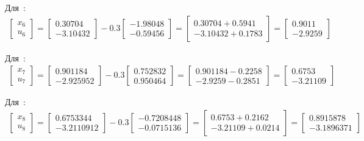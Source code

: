 \begin{enumerate}
	Для \,:
	\begin{align*}
		\begin{bmatrix}
			x_{6} \\ u_{6}
		\end{bmatrix}
		=
		\begin{bmatrix}
		   0.30704 \\
		  -3.10432
		\end{bmatrix}
		-
		0.3
		\begin{bmatrix}
			-1.98048 \\
			-0.59456
		\end{bmatrix}
		=
		\begin{bmatrix}
			0.30704 + 0.5941 \\ -3.10432 + 0.1783
		\end{bmatrix}
		= 
		\begin{bmatrix}
			0.9011 \\ -2.9259
		\end{bmatrix}	
	\end{align*}

	Для \,:
	\begin{align*}
		\begin{bmatrix}
		x_{7} \\ u_{7}
		\end{bmatrix}
		=
		\begin{bmatrix}
		   0.901184 \\
		  -2.925952
		\end{bmatrix}
		-
		0.3
		\begin{bmatrix}
			   0.752832 \\
			0.950464
		\end{bmatrix}
		=
		\begin{bmatrix}
			0.901184 - 0.2258 \\ -2.9259 - 0.2851
		\end{bmatrix}
		= 
		\begin{bmatrix}
			0.6753 \\ -3.21109
		\end{bmatrix}	
	\end{align*}

	Для \,:
	\begin{align*}
		\begin{bmatrix}
			x_{8} \\ u_{8}
		\end{bmatrix}
		=
		\begin{bmatrix}
			0.6753344\\
			-3.2110912
		\end{bmatrix}
		-
		0.3
		\begin{bmatrix}
			-0.7208448 \\
			-0.0715136
		\end{bmatrix}
		=
		\begin{bmatrix}
			0.6753 + 0.2162 \\ -3.21109 + 0.0214
		\end{bmatrix}
		= 
		\begin{bmatrix}
			0.8915878\\
			-3.1896371
		\end{bmatrix}	
	\end{align*}


\end{enumerate}
